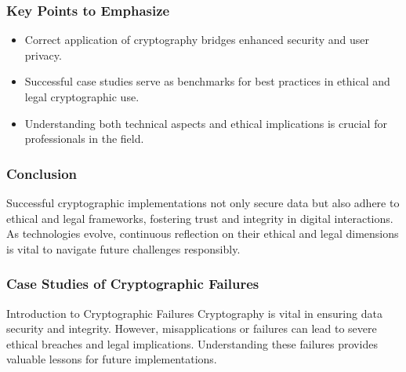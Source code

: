 \documentclass{beamer}
\begin{document}
\begin{frame}[fragile]
    \frametitle{Key Points to Emphasize}
    \begin{itemize}
        \item Correct application of cryptography bridges enhanced security and user privacy.
        \item Successful case studies serve as benchmarks for best practices in ethical and legal cryptographic use.
        \item Understanding both technical aspects and ethical implications is crucial for professionals in the field.
    \end{itemize}
\end{frame}

\begin{frame}[fragile]
    \frametitle{Conclusion}
    \begin{block}{}
        Successful cryptographic implementations not only secure data but also adhere to ethical and legal frameworks, fostering trust and integrity in digital interactions. 
        As technologies evolve, continuous reflection on their ethical and legal dimensions is vital to navigate future challenges responsibly.
    \end{block}
\end{frame}

\begin{frame}[fragile]
    \frametitle{Case Studies of Cryptographic Failures}
    
    \begin{block}{Introduction to Cryptographic Failures}
        Cryptography is vital in ensuring data security and integrity. However, misapplications or failures can lead to severe ethical breaches and legal implications. Understanding these failures provides valuable lessons for future implementations.
    \end{block}
\end{frame}
\end{document}
